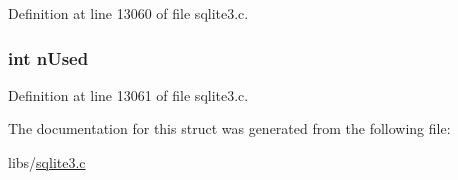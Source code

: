 Definition at line 13060 of file sqlite3.\+c.

\hypertarget{struct_printf_arguments_a927a6abaaf5a39d3d4bc2345084668d5}{}
\subsubsection[{n\+Used}]{\setlength{\rightskip}{0pt plus 5cm}int n\+Used}\label{struct_printf_arguments_a927a6abaaf5a39d3d4bc2345084668d5}


Definition at line 13061 of file sqlite3.\+c.



The documentation for this struct was generated from the following file\+:\begin{DoxyCompactItemize}
\item 
libs/\hyperlink{sqlite3_8c}{sqlite3.\+c}\end{DoxyCompactItemize}

